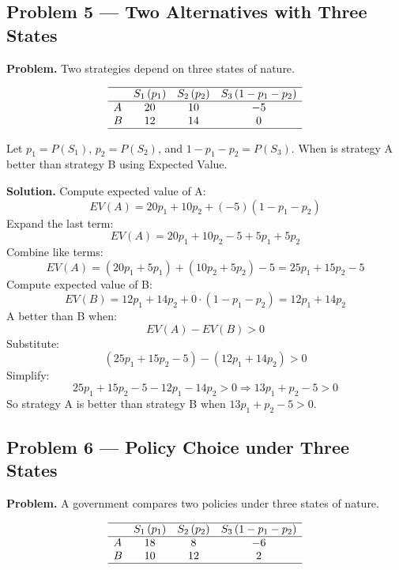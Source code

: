 \begin{ExamProblems}
		
		\hypertarget{c7-ex5}{}
		\item\leavevmode\par
		\subsection*{Problem 5 — Two Alternatives with Three States}
		
		\textbf{Problem.}
		Two strategies depend on three states of nature.
		
		\[
		\begin{array}{lccc}
			\hline
			& S_1\,(p_1) & S_2\,(p_2) & S_3\,(1-p_1-p_2) \\
			\hline
			A & 20 & 10 & -5 \\
			B & 12 & 14 & 0 \\
			\hline
		\end{array}
		\]
		
		Let \(p_1=P(S_1)\), \(p_2=P(S_2)\), and \(1-p_1-p_2=P(S_3)\).  
		When is strategy A better than strategy B using Expected Value.
		
		\textbf{Solution.}
		Compute expected value of A:
		\[
		EV(A)=20p_1 + 10p_2 + (-5)(1-p_1-p_2)
		\]
		Expand the last term:
		\[
		EV(A)=20p_1 + 10p_2 -5 + 5p_1 + 5p_2
		\]
		Combine like terms:
		\[
		EV(A)=(20p_1+5p_1) + (10p_2+5p_2) - 5 = 25p_1 + 15p_2 - 5
		\]
		Compute expected value of B:
		\[
		EV(B)=12p_1 + 14p_2 + 0\cdot(1-p_1-p_2)=12p_1+14p_2
		\]
		A better than B when:
		\[
		EV(A)-EV(B)>0
		\]
		Substitute:
		\[
		(25p_1+15p_2-5)-(12p_1+14p_2)>0
		\]
		Simplify:
		\[
		25p_1+15p_2-5-12p_1-14p_2>0
		\Rightarrow 13p_1+p_2-5>0
		\]
		So strategy A is better than strategy B when \(13p_1+p_2-5>0\).
		
		
		\hypertarget{c7-ex6}{}
		\item\leavevmode\par
		\subsection*{Problem 6 — Policy Choice under Three States}
		
		\textbf{Problem.}
		A government compares two policies under three states of nature.
		
		\[
		\begin{array}{lccc}
			\hline
			& S_1\,(p_1) & S_2\,(p_2) & S_3\,(1-p_1-p_2) \\
			\hline
			A & 18 & 8 & -6 \\
			B & 10 & 12 & 2 \\
			\hline
		\end{array}
		\]
		

\end{ExamProblems}

